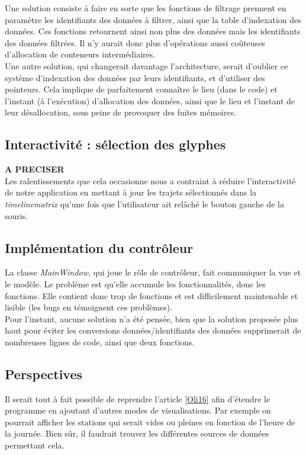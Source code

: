 \documentclass[12pt]{article}
\begin{document}
		Une solution consiste à faire en sorte que les fonctions de filtrage prennent en paramètre les identifiants des données à filtrer, ainsi que la table d’indexation des données. Ces fonctions retournent ainsi non plus des données mais les identifiants des données filtrées. Il n’y aurait donc plus d’opérations aussi coûteuses d’allocation de conteneurs intermédiaires.\\
	
		Une autre solution, qui changerait davantage l’architecture, serait d’oublier ce système d’indexation des données par leurs identifiants, et d’utiliser des pointeurs. Cela implique de parfaitement connaître le lieu (dans le code) et l’instant (à l'exécution) d’allocation des données, ainsi que le lieu et l’instant de leur désallocation, sous peine de provoquer des fuites mémoires.
	
		\subsection{Interactivité : sélection des glyphes}
		\textbf{A PRECISER}\\
		Les ralentissements que cela occasionne nous a contraint à réduire l’interactivité de
	notre application en mettant à jour les trajets sélectionnés dans la \textit{timelinematrix} qu’une
	fois que l’utilisateur ait relâché le bouton gauche de la souris.
		
		\subsection{Implémentation du contrôleur}
		La classe \textit{MainWindow}, qui joue le rôle de contrôleur, fait communiquer la vue et le modèle. Le problème est qu’elle accumule les fonctionnalités, donc les fonctions. Elle contient donc trop de fonctions et est difficilement maintenable et lisible (les bugs en témoignent ces problèmes).\\
	
		Pour l’instant, aucune solution n’a été pensée, bien que la solution proposée plus haut pour éviter les conversions données/identifiants des données supprimerait de nombreuses lignes de code, ainsi que deux fonctions.
		
		\subsection{Perspectives}
		Il serait tout à fait possible de reprendre l'article \ref{Oli16} afin d’étendre le programme
		en ajoutant d'autres modes de visualisations. Par exemple on pourrait afficher les stations
		qui serait vides ou pleines en fonction de l'heure de la journée. Bien sûr, il faudrait trouver
		les différentes sources de données permettant cela.
		
\end{document}

